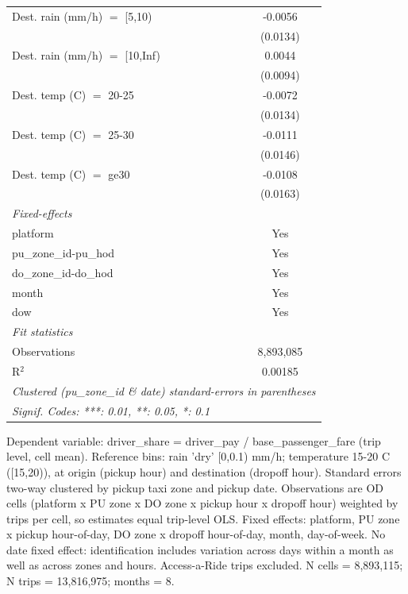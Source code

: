 \begin{tabular}{lc}
   Dest. rain (mm/h) $=$ [5,10)     & -0.0056\\   
                                    & (0.0134)\\   
   Dest. rain (mm/h) $=$ [10,Inf)   & 0.0044\\   
                                    & (0.0094)\\   
   Dest. temp (C) $=$ 20-25         & -0.0072\\   
                                    & (0.0134)\\   
   Dest. temp (C) $=$ 25-30         & -0.0111\\   
                                    & (0.0146)\\   
   Dest. temp (C) $=$ ge30          & -0.0108\\   
                                    & (0.0163)\\   
   \midrule
   \emph{Fixed-effects}\\
   platform                         & Yes\\  
   pu\_zone\_id-pu\_hod             & Yes\\  
   do\_zone\_id-do\_hod             & Yes\\  
   month                            & Yes\\  
   dow                              & Yes\\  
   \midrule
   \emph{Fit statistics}\\
   Observations                     & 8,893,085\\  
   R$^2$                            & 0.00185\\  
   \midrule \midrule
   \multicolumn{2}{l}{\emph{Clustered (pu\_zone\_id \& date) standard-errors in parentheses}}\\
   \multicolumn{2}{l}{\emph{Signif. Codes: ***: 0.01, **: 0.05, *: 0.1}}\\
\end{tabular}
 
\par \raggedright 
Dependent variable: driver\_share = driver\_pay / base\_passenger\_fare (trip level, cell mean). Reference bins: rain 'dry' [0,0.1) mm/h; temperature 15-20 C ([15,20)), at origin (pickup hour) and destination (dropoff hour). Standard errors two-way clustered by pickup taxi zone and pickup date. Observations are OD cells (platform x PU zone x DO zone x pickup hour x dropoff hour) weighted by trips per cell, so estimates equal trip-level OLS. Fixed effects: platform, PU zone x pickup hour-of-day, DO zone x dropoff hour-of-day, month, day-of-week. No date fixed effect: identification includes variation across days within a month as well as across zones and hours. Access-a-Ride trips excluded. N cells = 8,893,115; N trips = 13,816,975; months = 8.
\par\endgroup


\ifdefined\ifclassloaded
{}
\fi

